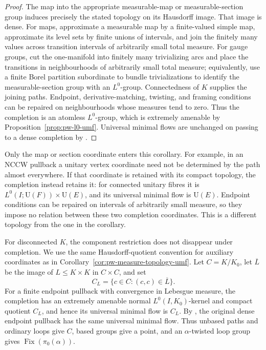 \begin{proof}
The map into the appropriate measurable-map or measurable-section group
induces precisely the stated topology on its Hausdorff image. That image is
dense. For maps, approximate a measurable map by a finite-valued simple map,
approximate its level sets by finite unions of intervals, and join the
finitely many values across transition intervals of arbitrarily small total
measure. For gauge groups, cut the one-manifold into finitely many trivializing
arcs and place the transitions in neighbourhoods of arbitrarily small total
measure; equivalently, use a finite Borel partition subordinate to bundle
trivializations to identify the measurable-section group with an
\(L^0\)-group. Connectedness of \(K\) supplies the joining paths. Endpoint,
derivative-matching, twisting, and framing conditions can be repaired on
neighbourhoods whose measures tend to zero. Thus the completion is an
atomless \(L^0\)-group, which is extremely amenable by
Proposition~\ref{prop:pw-l0-umf}. Universal minimal flows are unchanged on
passing to a dense completion by \cite[Fact~2.3]{BassoZucker2021}.
\end{proof}

Only the map or section coordinate enters this corollary. For example, in an
NCCW pullback a unitary vertex coordinate need not be determined by the path
almost everywhere. If that coordinate is retained with its compact topology,
the completion instead retains it: for connected unitary fibres it is
\(L^0(I;\mathrm U(F))\times\mathrm U(E)\), and its universal minimal flow
is \(\mathrm U(E)\). Endpoint conditions can be repaired on intervals of
arbitrarily small measure, so they impose no relation between these two
completion coordinates. This is a different topology from the one in the
corollary.

\begin{remark}\label{rem:pw-disconnected-measure-umf}
For disconnected \(K\), the component restriction does not disappear under
completion. We use the same Hausdorff-quotient convention for auxiliary
coordinates as in Corollary~\ref{cor:pw-measure-topology-umf}. Let \(C=K/K_0\), let \(\overline L\) be the image of
\(L\leq K\times K\) in \(C\times C\), and set
\[
C_L=\{c\in C:(c,c)\in\overline L\}.
\]
For a finite endpoint pullback with convergence in Lebesgue measure, the
completion has an extremely amenable normal \(L^0(I,K_0)\)-kernel and compact
quotient \(C_L\), and hence its universal minimal flow is \(C_L\). By
\cite[Fact~2.3]{BassoZucker2021}, the original dense endpoint pullback has the same
universal minimal flow. Thus unbased paths and ordinary loops give \(C\),
based groups give a point, and an \(\alpha\)-twisted loop group gives
\(\operatorname{Fix}(\pi_0(\alpha))\).
\end{remark}


